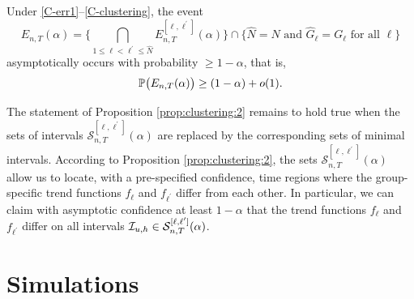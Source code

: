\documentclass[a4paper,12pt]{article}
\begin{document}
\begin{prop}\label{prop:clustering:2}
Under \ref{C-err1}--\ref{C-clustering}, the event 
\[ E_{n,T}(\alpha) = \Big\{ \bigcap_{1 \le \ell < \ell^\prime \le \widehat{N}} E_{n,T}^{[\ell,\ell^\prime]}(\alpha) \Big\} \cap \Big\{ \widehat{N} = N \text{ and } \widehat{G}_\ell = G_\ell \text{ for all } \ell \Big\} \]
asymptotically occurs with probability $\ge 1-\alpha$, that is, 
\[ \mathbb{P} \big( E_{n,T}(\alpha) \big) \ge (1 - \alpha) + o(1). \]
\end{prop}
The statement of Proposition \ref{prop:clustering:2} remains to hold true when the sets of intervals %
$\mathcal{S}^{[\ell,\ell^\prime]}_{n, T}(\alpha)$ are replaced by the corresponding sets of minimal intervals. According to Proposition \ref{prop:clustering:2}, the sets %
$\mathcal{S}^{[\ell,\ell^\prime]}_{n, T}(\alpha)$ allow us to locate, with a pre-specified confidence, time regions where the group-specific trend functions $f_\ell$ and $f_{\ell^\prime}$ differ from each other. In particular, we can claim with asymptotic confidence at least $1 - \alpha$ that the trend functions $f_\ell$ and $f_{\ell^\prime}$ differ on all intervals $\mathcal{I}_{u, h} \in \mathcal{S}^{[\ell,\ell^\prime]}_{n, T}(\alpha)$. %



\section{Simulations}\label{sec:sim}
\end{document}
